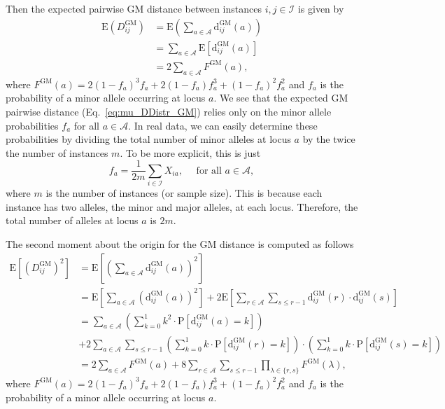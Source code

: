 \documentclass[10pt,letterpaper]{article}
\begin{document}
Then the expected pairwise GM distance between instances $i,j \in \mathcal{I}$ is given by
%
\begin{equation}\label{eq:mu_DDistr_GM}
\begin{aligned}
\text{E}\left(D^\text{GM}_{ij}\right) &= \text{E}\left(\sum_{a \in \mathcal{A}} \text{d}^\text{GM}_{ij}(a)\right) \\
&= \sum_{a \in \mathcal{A}} \text{E}\left[\text{d}^\text{GM}_{ij}(a)\right] \\
&= 2 \sum_{a \in \mathcal{A}} F^\text{GM}(a),
\end{aligned}
\end{equation}
%
where $F^\text{GM}(a) = 2(1 - f_a)^3f_a + 2(1 - f_a)f^3_a + (1 - f_a)^2f^2_a$ and $f_a$ is the probability of a minor allele occurring at locus $a$. We see that the expected GM pairwise distance (Eq.~\ref{eq:mu_DDistr_GM}) relies only on the minor allele probabilities $f_a$ for all $a \in \mathcal{A}$. In real data, we can easily determine these probabilities by dividing the total number of minor alleles at locus $a$ by the twice the number of instances $m$. To be more explicit, this is just
%
\[
f_a = \frac{1}{2m}\sum_{i \in \mathcal{I}} X_{ia},  \quad \text{ for all } a \in \mathcal{A},
\]
%
where $m$ is the number of instances (or sample size). This is because each instance has two alleles, the minor and major alleles, at each locus. Therefore, the total number of alleles at locus $a$ is $2m$.

The second moment about the origin for the GM distance is computed as follows
%
\begin{equation}\label{eq:mu2_DDistr_GM}
\begin{aligned}
\text{E}\left[\left(D^\text{GM}_{ij}\right)^2\right] &= \text{E}\left[\left(\sum_{a \in \mathcal{A}} \text{d}^\text{GM}_{ij}(a)\right)^2\right] \\
&= \text{E}\left[\sum_{a \in \mathcal{A}} \left(\text{d}^\text{GM}_{ij}(a)\right)^2\right] + 2 \text{E}\left[\sum_{r \in \mathcal{A}} \sum_{s \leq r - 1} \text{d}^\text{GM}_{ij}(r) \cdot \text{d}^\text{GM}_{ij}(s)\right] \\
&= \sum_{a \in \mathcal{A}} \left(\sum_{k = 0}^{1} k^2 \cdot \text{P}\left[\text{d}^\text{GM}_{ij}(a) = k\right]\right) \\
&+ 2\sum_{a \in \mathcal{A}} \sum_{s \leq r - 1} \left(\sum_{k = 0}^{1} k \cdot \text{P}\left[\text{d}^\text{GM}_{ij}(r) = k\right]\right) \cdot \left(\sum_{k = 0}^{1} k \cdot \text{P}\left[\text{d}^\text{GM}_{ij}(s) = k\right]\right) \\
&= 2\sum_{a \in \mathcal{A}} F^\text{GM}(a) + 8 \sum_{r \in \mathcal{A}} \sum_{s \leq r - 1} \prod_{\lambda \in \{r,s\}} F^\text{GM}(\lambda),
\end{aligned}
\end{equation}
%
where $F^\text{GM}(a) = 2(1 - f_a)^3f_a + 2(1 - f_a)f^3_a + (1 - f_a)^2f^2_a$ and $f_a$ is the probability of a minor allele occurring at locus $a$.
\end{document}

